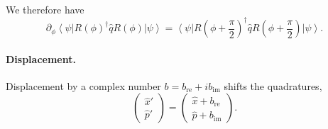 \documentclass[aps,pra,10pt,twocolumn,groupedaddress,nofootinbib]{revtex4-1}
\theoremstyle{plain}
\newcommand{\ket}[1]{\ensuremath{\left| #1 \right \rangle}}
\newcommand{\bra}[1]{\ensuremath{\left \langle #1 \right |}}
\newcommand{\x}{\hat{x}}
\newcommand{\p}{\hat{p}}
\begin{document}
We therefore have
\begin{equation} \label{eq:derivative_rhase_rotation}
  \partial_{\phi}\bra{\psi} R(\phi)^{\dagger} \hat{q} R(\phi) \ket{\psi} =  \bra{\psi} R(\phi + \frac{\pi}{2})^{\dagger} \hat{q} R(\phi + \frac{\pi}{2}) \ket{\psi}. 
\end{equation}

\paragraph{Displacement.}

Displacement by a complex number $b = b_{\mathrm{re}} + i b_{\mathrm{im}}$ shifts the quadratures,
\[
\begin{pmatrix}
\x'\\
\p'
\end{pmatrix} = \begin{pmatrix} \x + b_{\mathrm{re}} \\ \p + b_{\mathrm{im}} \end{pmatrix}. \]
\end{document}
